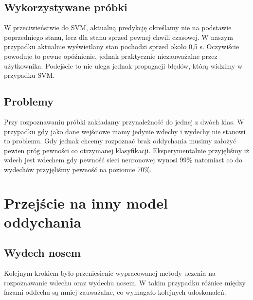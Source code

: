 \documentclass[polish]{article}
\begin{document}
\subsection{Wykorzystywane próbki}
W przeciwieństwie do SVM, aktualną predykcję określamy nie na podstawie poprzedniego stanu, lecz dla stanu sprzed pewnej chwili czasowej. W naszym przypadku aktualnie wyświetlany stan pochodzi sprzed około 0,5 s. Oczywiście powoduje to pewne opóźnienie, jednak praktycznie niezauważalne przez użytkownika. Podejście to nie ulega jednak propagacji błędów, którą widzimy w przypadku SVM.
\subsection{Problemy}
Przy rozpoznawaniu próbki zakładamy przynależność do jednej z dwóch klas. W przypadku gdy jako dane wejściowe mamy jedynie wdechy i wydechy nie stanowi to problemu. Gdy jednak chcemy rozpoznać brak oddychania musimy założyć pewien próg pewności co otrzymanej klasyfikacji. Eksperymentalnie przyjęliśmy iż wdech jest wdechem gdy pewność sieci neuronowej wynosi 99\% natomiast co do wydechów przyjęliśmy pewność na poziomie 70\%. 

\section{Przejście na inny model oddychania}
\subsection{Wydech nosem}
Kolejnym krokiem było przeniesienie wypracowanej metody uczenia na rozpoznawanie wdechu oraz wydechu nosem. W takim przypadku różnice między fazami oddechu są mniej zauważalne, co wymagało kolejnych udoskonaleń.
\end{document}
